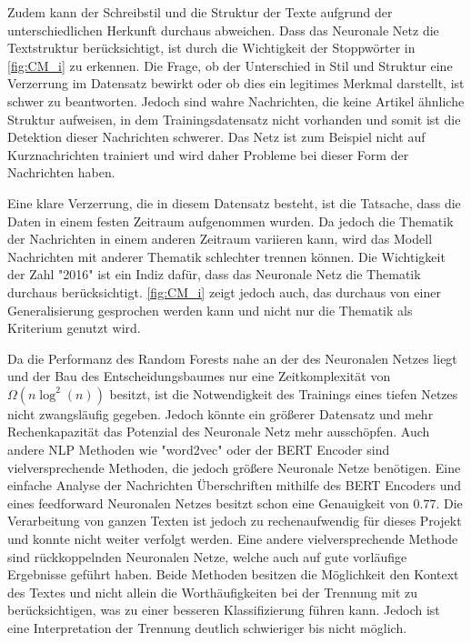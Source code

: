 Zudem kann der Schreibstil und die Struktur der Texte aufgrund der unterschiedlichen Herkunft 
durchaus abweichen.
Dass das Neuronale Netz die Textstruktur berücksichtigt, ist durch die Wichtigkeit der Stoppwörter in \autoref{fig:CM_i}
zu erkennen.
Die Frage, ob der Unterschied in Stil und Struktur eine Verzerrung im Datensatz bewirkt oder ob dies ein 
legitimes Merkmal darstellt, ist schwer zu beantworten.
Jedoch sind wahre Nachrichten, die keine Artikel ähnliche Struktur aufweisen, in dem Trainingsdatensatz nicht 
vorhanden und somit ist die Detektion dieser Nachrichten schwerer.
Das Netz ist zum Beispiel nicht auf Kurznachrichten trainiert und wird daher Probleme bei dieser Form der Nachrichten 
haben.


Eine klare Verzerrung, die in diesem Datensatz besteht, ist die Tatsache, dass die Daten in einem festen 
Zeitraum aufgenommen wurden.
Da jedoch die Thematik der Nachrichten in einem anderen Zeitraum variieren kann, wird das 
Modell Nachrichten mit anderer Thematik schlechter trennen können.
Die Wichtigkeit der Zahl "2016" ist ein Indiz dafür, dass das Neuronale Netz die Thematik durchaus berücksichtigt.
\autoref{fig:CM_i} zeigt jedoch auch, das durchaus von einer Generalisierung gesprochen werden kann und nicht nur 
die Thematik als Kriterium genutzt wird.

Da die Performanz des Random Forests nahe an der des Neuronalen Netzes liegt und der Bau des Entscheidungsbaumes 
nur eine Zeitkomplexität von $\Omega(n \log^2 (n))$\cite[96]{understanding_RF} besitzt, ist die Notwendigkeit des 
Trainings eines tiefen Netzes nicht zwangsläufig gegeben.
Jedoch könnte ein größerer Datensatz und mehr Rechenkapazität das Potenzial des Neuronale Netz mehr ausschöpfen.
Auch andere NLP Methoden wie "word2vec" oder der BERT Encoder\cite{bert} sind vielversprechende Methoden, die jedoch 
größere Neuronale Netze benötigen. 
Eine einfache Analyse der Nachrichten Überschriften mithilfe des BERT Encoders und eines feedforward Neuronalen 
Netzes besitzt schon eine Genauigkeit von $0.77$. 
Die Verarbeitung von ganzen Texten ist jedoch zu rechenaufwendig für dieses Projekt und konnte nicht weiter 
verfolgt werden.
Eine andere vielversprechende Methode sind rückkoppelnden Neuronalen Netze, welche auch auf gute vorläufige Ergebnisse 
geführt haben.
Beide Methoden besitzen die Möglichkeit den Kontext des Textes und nicht allein die Worthäufigkeiten bei der 
Trennung mit zu berücksichtigen, was zu einer besseren Klassifizierung führen kann.
Jedoch ist eine Interpretation der Trennung deutlich schwieriger bis nicht möglich.

